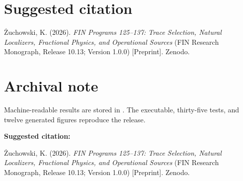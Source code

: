 \documentclass[11pt,a4paper,openany]{report}
\begin{document}
\chapter{Suggested citation}

\.Zuchowski, K. (2026). \emph{FIN Programs 125--137: Trace Selection, Natural Localizers, Fractional Physics, and Operational Sources} (FIN Research Monograph, Release 10.13; Version 1.0.0) [Preprint]. Zenodo.


\clearpage
\chapter*{Archival note}
Machine-readable results are stored in
.
The executable, thirty-five tests, and twelve generated figures reproduce the
release.

\medskip
\noindent\textbf{Suggested citation:}

\.Zuchowski, K. (2026). \emph{FIN Programs 125--137: Trace Selection,
Natural Localizers, Fractional Physics, and Operational Sources}
(FIN Research Monograph, Release 10.13; Version 1.0.0) [Preprint]. Zenodo.
\end{document}
